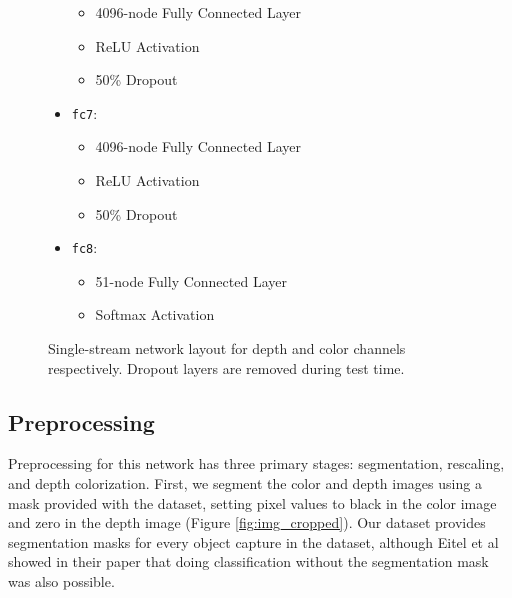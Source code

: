 \begin{figure}
\begin{mdframed}
\begin{itemize}
\begin{itemize}
				\item 4096-node Fully Connected Layer
				\item ReLU Activation
				\item 50\% Dropout
			\end{itemize}
			\item \texttt{fc7}:
			\begin{itemize}
				\item 4096-node Fully Connected Layer
				\item ReLU Activation
				\item 50\% Dropout
			\end{itemize}
			\item \texttt{fc8}:
			\begin{itemize}
				\item 51-node Fully Connected Layer
				\item Softmax Activation
			\end{itemize}
		\end{itemize}
	\end{mdframed}
	\caption{Single-stream network layout for depth and color channels respectively. Dropout layers are removed during test time.}
	\label{fig:single_stream_layout}
\end{figure}


\subsection{Preprocessing}
\label{subsec:preprocessing}
Preprocessing for this network has three primary stages: segmentation, rescaling, and depth colorization. First, we segment the color and depth images using a mask provided with the dataset, setting pixel values to black in the color image and zero in the depth image (Figure \ref{fig:img_cropped}). Our dataset provides segmentation masks for every object capture in the dataset, although Eitel et al \cite{Eitel2015} showed in their paper that doing classification without the segmentation mask was also possible.

